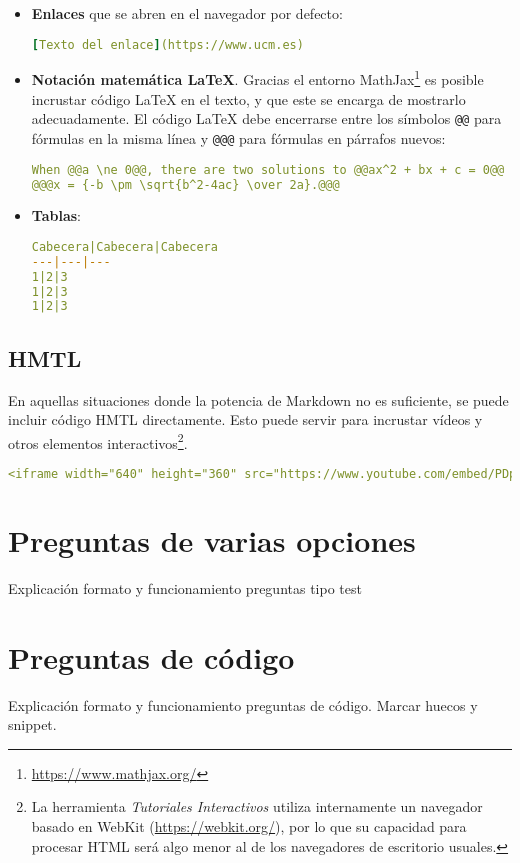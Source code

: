 \documentclass[]{article}
\newcommand{\code}[1]{{\lstinline[basicstyle=\ttfamily,mathescape]!#1!}}
\newcommand{\toolname}{\emph{Tutoriales Interactivos}}
\begin{document}
\begin{itemize}
\begin{lstlisting}[language=yaml,numbers=none]
**Imagen desde el directorio de temas, con ruta relativa**
![triangulo](file:///img/triangulo.jpg)
\end{lstlisting}		
Todas las imágenes cuya ruta comience con \code{file://} serán consideradas imágenes locales cuya ruta es relativa al directorio donde reside el tema actual. Por ejemplo, si el tema actual reside en \code{/opt/temas/Python 3.x}, la imagen \code{file:///img/triangulo.jpg} se referirá al fichero situado en \code{/opt/temas/Python 3.x/img/triangulo.jpg}.
	\item \textbf{Enlaces} que se abren en el navegador por defecto:
\begin{lstlisting}[language=yaml,numbers=none]
[Texto del enlace](https://www.ucm.es)
\end{lstlisting}
	\item \textbf{Notación matemática \LaTeX}. Gracias el entorno MathJax\footnote{\url{https://www.mathjax.org/}} es posible incrustar código \LaTeX{} en el texto, y que este se encarga de mostrarlo adecuadamente. El código \LaTeX{} debe encerrarse entre los símbolos \code{@@} para fórmulas en la misma línea y \code{@@@} para fórmulas en párrafos nuevos:
\begin{lstlisting}[language=yaml,numbers=none]
When @@a \ne 0@@, there are two solutions to @@ax^2 + bx + c = 0@@ and they are
@@@x = {-b \pm \sqrt{b^2-4ac} \over 2a}.@@@	
\end{lstlisting}
	\item \textbf{Tablas}:
\begin{lstlisting}[language=yaml,numbers=none]
Cabecera|Cabecera|Cabecera
---|---|---
1|2|3
1|2|3
1|2|3
\end{lstlisting}	
\end{itemize}

\subsection{HMTL}
En aquellas situaciones donde la potencia de Markdown no es suficiente, se puede incluir código HMTL directamente. Esto puede servir para incrustar vídeos y otros elementos interactivos\footnote{La herramienta \toolname{} utiliza internamente un navegador basado en WebKit (\url{https://webkit.org/}), por lo que su capacidad para procesar HTML será algo menor al de los navegadores de escritorio usuales.}.
\begin{lstlisting}[language=yaml,numbers=none]
<iframe width="640" height="360" src="https://www.youtube.com/embed/PDpMgx7avzA" frameborder="0" allowfullscreen target="_self"></iframe>
\end{lstlisting}		

\section{Preguntas de varias opciones}
Explicación formato y funcionamiento preguntas tipo test

\section{Preguntas de código}
Explicación formato y funcionamiento preguntas de código. Marcar huecos y snippet.
\end{document}
